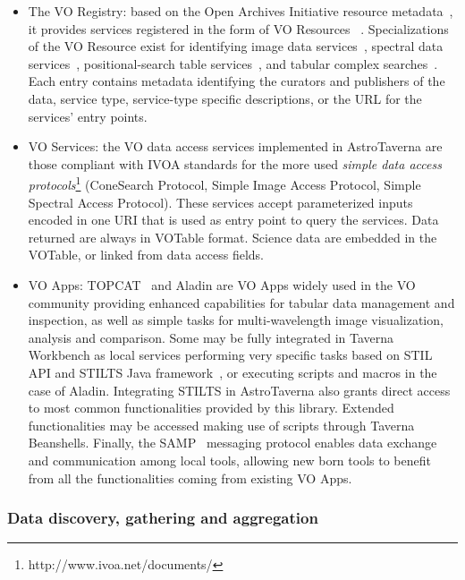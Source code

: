 \documentclass{aa}
\begin{document}
\begin{itemize}
\item The VO Registry: based on the Open Archives Initiative resource metadata~\citep{2002OAI-PMH},  it provides services registered in the form of VO Resources ~\citep{Hanisch2007}. Specializations of the VO Resource exist for identifying image data services~\citep[Simple Image Access Protocol;][]{Tody2009}, spectral data services~\citep[Simple Spectral Access Protocol;][]{Tody2012}, positional-search table services~\citep[ConeSearch Protocol;][]{Williams2008}, and tabular complex searches~\citep[Tabular Access Protocol;][]{Dowler2010}. Each entry contains metadata identifying the curators and publishers of the data, service type, service-type specific descriptions, or the URL for the services’ entry points. 

\item VO Services: the VO data access services implemented in AstroTaverna are those compliant with IVOA standards for the more used \textit{simple data access protocols}\footnote{http://www.ivoa.net/documents/} (ConeSearch Protocol, Simple Image Access Protocol, Simple Spectral Access Protocol). These services accept parameterized inputs encoded in one URI that is used as entry point to query the services. Data returned are always in VOTable format. Science data are embedded in the VOTable, or linked from data access fields.

\item VO Apps: TOPCAT~\citep{Taylor2011} and Aladin are VO Apps widely used in the VO community providing enhanced capabilities for tabular data management and inspection, as well as simple tasks for multi-wavelength image visualization, analysis and comparison. Some may be fully integrated in Taverna Workbench as local services performing very specific tasks based on STIL API and STILTS Java framework~\citep{Taylor2006}, or executing scripts and macros in the case of Aladin. Integrating STILTS in AstroTaverna also grants direct access to most common functionalities provided by this library. Extended functionalities may be accessed making use of scripts through Taverna Beanshells. Finally, the SAMP~\citep[Simple Application Messaging Protocol;][]{Taylor2012} messaging protocol enables data exchange and communication among local tools, allowing new born tools to benefit from all the functionalities coming from existing VO Apps.
\end{itemize}

\subsubsection{Data discovery, gathering and aggregation}
\label{DataDiscovery}
\end{document}
